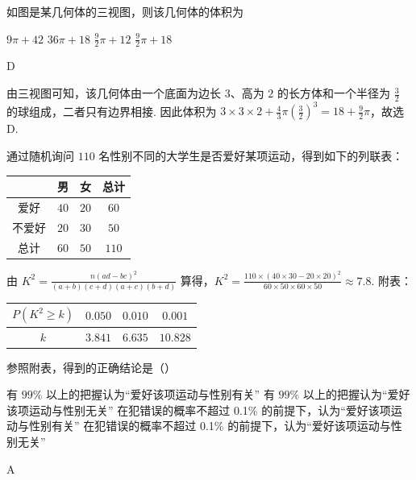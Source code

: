 \begin{problem}
如图是某几何体的三视图，则该几何体的体积为


\choices
    {\(9\pi + 42\)}
    {\(36\pi + 18\)}
    {\(\frac{9}{2}\pi + 12\)}
    {\(\frac{9}{2}\pi + 18\)}
\end{problem}

\begin{answer}
D
\end{answer}

\begin{solution}
由三视图可知，该几何体由一个底面为边长 \(3\)、高为 \(2\) 的长方体和一个半径为 \(\frac32\) 的球组成，二者只有边界相接. 因此体积为
\(3\times3\times2+\frac43\pi\left(\frac32\right)^3=18+\frac92\pi\)，故选 D.
\end{solution}

\begin{problem}
通过随机询问 \(110\) 名性别不同的大学生是否爱好某项运动，得到如下的列联表：
\begin{center}
\begin{tabular}{c|ccc}
 & 男 & 女 & 总计 \\
\hline
爱好 & \(40\) & \(20\) & \(60\) \\
不爱好 & \(20\) & \(30\) & \(50\) \\
\hline
总计 & \(60\) & \(50\) & \(110\)
\end{tabular}
\end{center}
由 \(K^2 = \frac{n(ad-bc)^2}{(a + b)(c + d)(a + c)(b + d)}\) 算得，\(K^2 = \frac {110 \times (40 \times 30 - 20 \times 20) ^{2}}{60 \times 50 \times 60 \times 50} \approx 7.8\). 附表：
\begin{center}
\begin{tabular}{c|ccc}
\(P(K^2 \geqslant k)\) & \(0.050\) & \(0.010\) & \(0.001\) \\
\hline
\(k\) & \(3.841\) & \(6.635\) & \(10.828\)
\end{tabular}
\end{center}
参照附表，得到的正确结论是（\quad）

\choices
    {有 \(99\%\) 以上的把握认为“爱好该项运动与性别有关”}
    {有 \(99\%\) 以上的把握认为“爱好该项运动与性别无关”}
    {在犯错误的概率不超过 0.1\% 的前提下，认为“爱好该项运动与性别有关”}
    {在犯错误的概率不超过 0.1\% 的前提下，认为“爱好该项运动与性别无关”}
\end{problem}

\begin{answer}
A
\end{answer}

